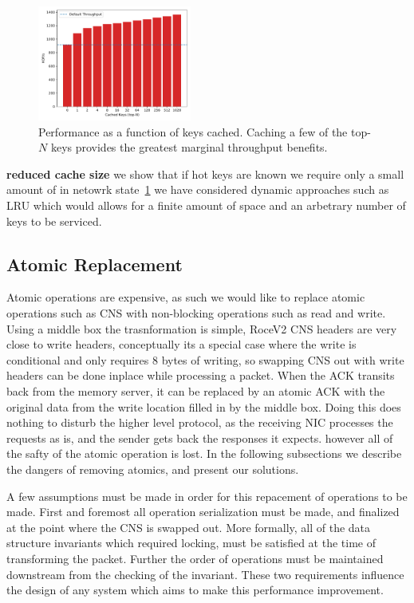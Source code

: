 \begin{figure}
    \includegraphics[width=0.45\textwidth]{fig/cache.pdf}
    \caption{Performance as a function of keys cached. Caching a few
    of the top-$N$ keys provides the greatest marginal throughput
    benefits.}
    \label{fig:cache}
\end{figure}

\textbf{reduced cache size} we show that if hot keys are known we require only a
small amount of in netowrk state~\ref{fig:cache} we have considered dynamic
approaches such as LRU which would allows for a finite amount of space and an
arbetrary number of keys to be serviced.

\subsection{Atomic Replacement} Atomic operations are expensive, as such we
would like to replace atomic operations such as CNS with non-blocking operations
such as read and write. Using a middle box the trasnformation is simple, RoceV2
CNS headers are very close to write headers, conceptually its a special case
where the write is conditional and only requires 8 bytes of writing, so swapping
CNS out with write headers can be done inplace while processing a packet. When
the ACK transits back from the memory server, it can be replaced by an atomic
ACK with the original data from the write location filled in by the middle box.
Doing this does nothing to disturb the higher level protocol, as the receiving
NIC processes the requests as is, and the sender gets back the responses it
expects. however all of the safty of the atomic operation is lost.  In the
following subsections we describe the dangers of removing atomics, and present
our solutions.

A few assumptions must be made in order for this repacement of operations to be
made. First and foremost all operation serialization must be made, and finalized
at the point where the CNS is swapped out. More formally, all of the data
structure invariants which required locking, must be satisfied at the time of
transforming the packet. Further the order of operations must be maintained
downstream from the checking of the invariant. These two requirements influence
the design of any system which aims to make this performance improvement. 

